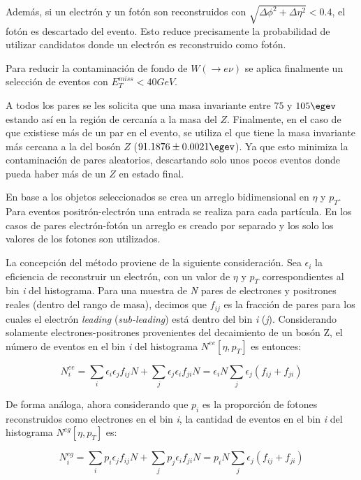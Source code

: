 Además, si un electrón y un fotón son reconstruidos con $\sqrt{\Delta\phi^{2}+\Delta\eta^{2}}<0.4$, el fotón es descartado del evento. Esto reduce precisamente la probabilidad de utilizar candidatos donde un electrón es reconstruido como fotón. 

Para reducir la contaminación de fondo de $W (\rightarrow e\nu)$ se aplica finalmente un selección de eventos con $E_{T}^{miss} < 40 GeV$. 


A todos los pares se les solicita que una masa invariante entre $75$ y $105 \egev$  estando así en la región de cercanía a la masa del $Z$. Finalmente, en el caso de que existiese más de un par en el evento, se utiliza el que tiene la masa invariante más cercana a la del bosón $Z$ ($91.1876 \pm 0.0021 \egev$\cite{Olive:2016xmw}). Ya que esto minimiza la contaminación de pares aleatorios, descartando solo unos pocos eventos donde pueda haber más de un $Z$ en estado final.


En base a los objetos seleccionados se crea un arreglo bidimensional en  $\eta$ y $p_{T}$. Para eventos positrón-electrón una entrada se realiza para cada partícula. En los casos de pares electrón-fotón un arreglo es creado por separado y los solo los valores de los fotones son utilizados.

La concepción del método proviene de la siguiente consideración. Sea $\epsilon_{i}$ la eficiencia de reconstruir un electrón, con un valor de $\eta$ y $p_{T}$ correspondientes al bin \textit{i} del histograma. Para una muestra de \textit{N} pares de electrones y positrones reales (dentro del rango de masa), decimos que $f_{ij}$ es la fracción de pares para los cuales el electrón \textit{leading} (\textit{sub-leading}) está dentro del bin \textit{i} (\textit{j}). Considerando solamente electrones-positrones provenientes del decaimiento de un bosón Z, el número de eventos en el bin \textit{i} del histograma $N^{ee}[\eta , p_{T}]$ es entonces:

\begin{equation}
N_{i}^{ee} = \sum_{i}\epsilon_{i}\epsilon_{j}f_{ij}N + \sum_{j}\epsilon_{j}\epsilon_{i}f_{ji}N = \epsilon_{i}N\sum_{j}\epsilon_{j}(f_{ij}+f_{ji})
\end{equation}

De forma análoga, ahora considerando que $p_{i}$ es la proporción de fotones reconstruidos como electrones en el bin \textit{i}, la cantidad de eventos en el bin \textit{i} del histograma $N^{eg}[\eta , p_{T}]$ es:

\begin{equation}
N_{i}^{eg} = \sum_{i}p_{i}\epsilon_{j}f_{ij}N + \sum_{j}p_{j}\epsilon_{i}f_{ji}N = p_{i}N\sum_{j}\epsilon_{j}(f_{ij}+f_{ji})
\end{equation}

